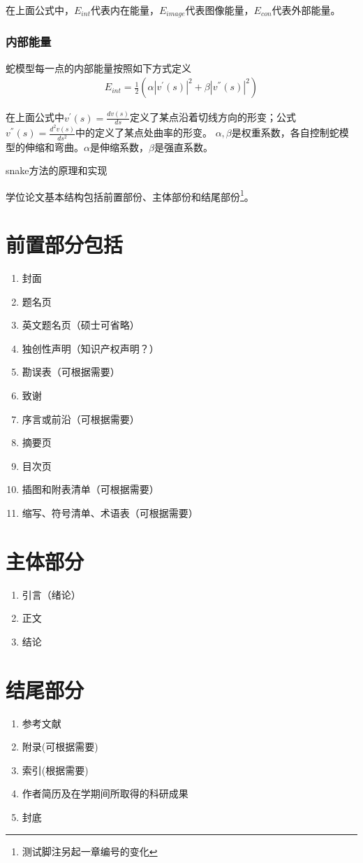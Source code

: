 在上面公式中，$E_{int}$代表内在能量，$E_{image}$代表图像能量，$E_{con}$代表外部能量。

\subsubsection{内部能量}
蛇模型每一点的内部能量按照如下方式定义
\begin{align}\label{eq:base_snake_calculative_internal_representation}
	E_{int} = \frac{1}{2}(\alpha|v^{'}(s)|^{2}+\beta|v^{''}(s)|^{2})
\end{align}

在上面公式中$v^{'}(s)=\frac{dv(s)}{ds}$定义了某点沿着切线方向的形变；公式$v^{''}(s)=\frac{d^{2}v(s)}{ds^{2}}$中的定义了某点处曲率的形变。
$\alpha,\beta$是权重系数，各自控制蛇模型的伸缩和弯曲。$\alpha$是伸缩系数，$\beta$是强直系数。






snake方法的原理和实现

学位论文基本结构包括前置部份、主体部份和结尾部份\footnote{测试脚注另起一章编号的变化}。
\section{前置部分包括}
\begin{enumerate}
	\item 封面
	\item 题名页
	\item 英文题名页（硕士可省略）
	\item 独创性声明（知识产权声明？）
	\item 勘误表（可根据需要）
	\item 致谢
	\item 序言或前沿（可根据需要）
	\item 摘要页
	\item 目次页
	\item 插图和附表清单（可根据需要）
	\item 缩写、符号清单、术语表（可根据需要）
\end{enumerate}
\section{主体部分}
\begin{enumerate}
	\item 引言（绪论）
	\item 正文
	\item 结论
\end{enumerate}
\section{结尾部分}
\begin{enumerate}
	\item 参考文献
	\item 附录(可根据需要)
	\item 索引(根据需要)
	\item 作者简历及在学期间所取得的科研成果
	\item 封底
\end{enumerate}
